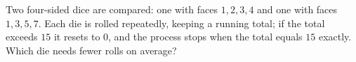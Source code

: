 Two four-sided dice are compared: one with faces $1,2,3,4$ and one with faces $1,3,5,7$. Each die is rolled repeatedly, keeping a running total; if the total exceeds $15$ it resets to $0$, and the process stops when the total equals $15$ exactly. Which die needs fewer rolls on average?
